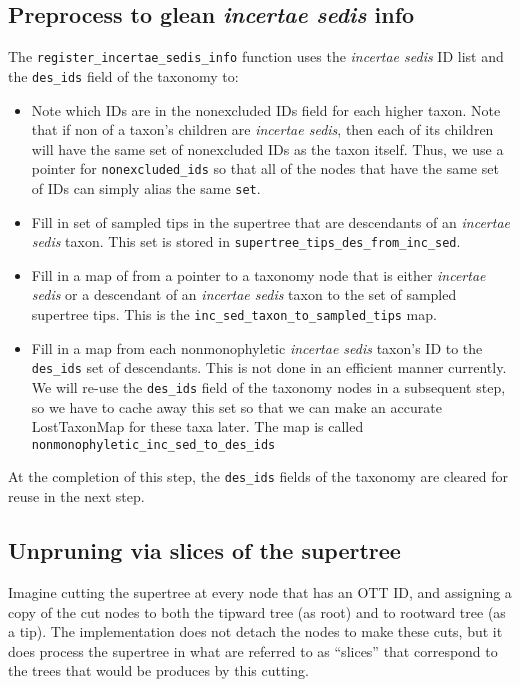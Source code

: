 \documentclass[english]{article}
\newcommand{\incsed}[0]{{\em incertae sedis}\xspace}
\begin{document}
\subsection{Preprocess to glean \incsed info}
The \texttt{register\_incertae\_sedis\_info} function uses the \incsed ID list
    and the \texttt{des\_ids} field of the taxonomy to:
\begin{itemize}
  \item Note which IDs are in the nonexcluded IDs field for each higher taxon.
    Note that if non of a taxon's children are \incsed, then each of its
    children will have the same set of nonexcluded IDs as the taxon itself.
    Thus, we use a pointer for \texttt{nonexcluded\_ids} so that all of the 
    nodes that have the same set of IDs can simply alias the same \texttt{set}.
  \item Fill in set of sampled tips in the supertree that are descendants of
    an \incsed taxon. This set is stored in \texttt{supertree\_tips\_des\_from\_inc\_sed}.
  \item Fill in a map of from a pointer to a taxonomy node that is either \incsed or a descendant
    of an \incsed taxon to the set of sampled supertree tips. This is
    the \texttt{inc\_sed\_taxon\_to\_sampled\_tips} map.
  \item Fill in a map from each nonmonophyletic \incsed taxon's ID to the
    \texttt{des\_ids} set of descendants.
    This is not done in an efficient manner currently.
    We will re-use the \texttt{des\_ids} field of the taxonomy nodes in a subsequent
    step, so we have to cache away this set so that we can make an accurate LostTaxonMap
    for these taxa later. The map is called \texttt{nonmonophyletic\_inc\_sed\_to\_des\_ids}
\end{itemize}
At the completion of this step, the \texttt{des\_ids} fields of the taxonomy are
    cleared for reuse in the next step.

\subsection{Unpruning via slices of the supertree}
Imagine cutting the supertree at every node that has an OTT ID, and
   assigning a copy of the cut nodes to both the tipward tree (as root)
   and to rootward tree (as a tip).
The implementation does not detach the nodes to make these cuts, but
    it does process the supertree in what are referred to as ``slices''
    that correspond to the trees that would be produces by this cutting.
\end{document}
